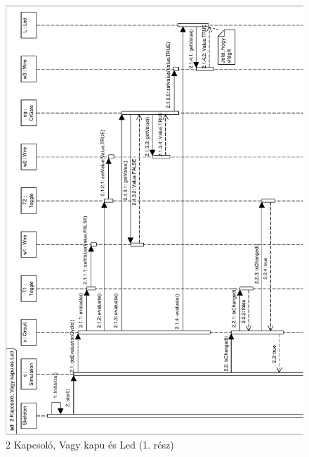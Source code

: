 \begin{figure}[H]
\begin{center}
\includegraphics[width=16cm]{chapters/chapter05/imgs/test3-1.pdf}
\caption{2 Kapcsoló, Vagy kapu és Led (1. rész)}
\label{fig:init}
\end{center}
\end{figure}

